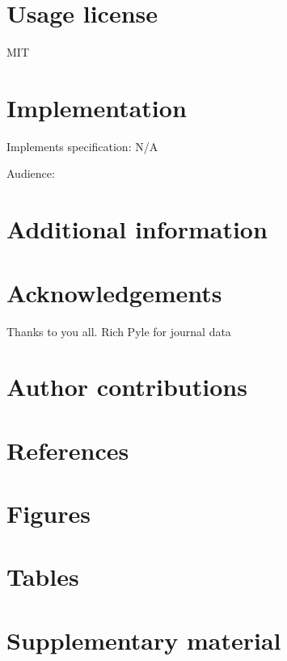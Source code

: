 \documentclass[
]{article}
\begin{document}
\hypertarget{usage-license}{%
\section{Usage license}\label{usage-license}}

MIT

\hypertarget{implementation}{%
\section{Implementation}\label{implementation}}

Implements specification: N/A

Audience:

\hypertarget{additional-information}{%
\section{Additional information}\label{additional-information}}

\hypertarget{acknowledgements}{%
\section{Acknowledgements}\label{acknowledgements}}

Thanks to you all. Rich Pyle for journal data

\hypertarget{author-contributions}{%
\section{Author contributions}\label{author-contributions}}

\hypertarget{references}{%
\section{References}\label{references}}

\hypertarget{figures}{%
\section{Figures}\label{figures}}

\hypertarget{tables}{%
\section{Tables}\label{tables}}

\hypertarget{supplementary-material}{%
\section{Supplementary material}\label{supplementary-material}}
\end{document}
